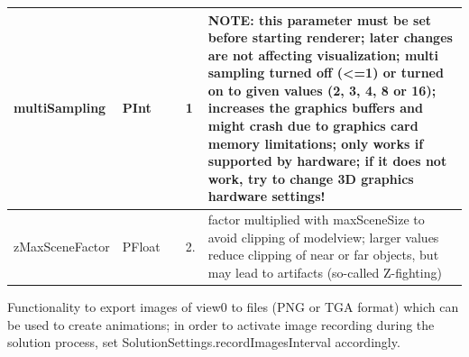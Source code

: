 \begin{center}
\begin{longtable}{| p{4.2cm} | p{2.5cm} | p{0.3cm} | p{3.0cm} | p{6cm} |}
    multiSampling &     PInt &      &     1 &     NOTE: this parameter must be set before starting renderer; later changes are not affecting visualization; multi sampling turned off (<=1) or turned on to given values (2, 3, 4, 8 or 16); increases the graphics buffers and might crash due to graphics card memory limitations; only works if supported by hardware; if it does not work, try to change 3D graphics hardware settings!\\ \hline
    zMaxSceneFactor &     PFloat &      &     2. &     factor multiplied with maxSceneSize to avoid clipping of modelview; larger values reduce clipping of near or far objects, but may lead to artifacts (so-called Z-fighting)\\ \hline
	  \end{longtable}
	\end{center}



\label{sec:VSettingsExportImages}
Functionality to export images of view0 to files (PNG or TGA format) which can be used to create animations; in order to activate image recording during the solution process, set SolutionSettings.recordImagesInterval accordingly.

